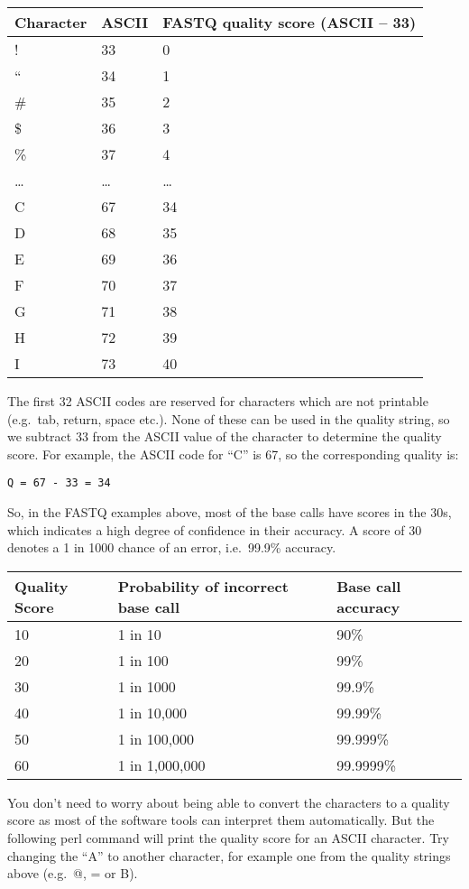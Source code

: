 \documentclass[11pt]{article}
\begin{document}
\begin{longtable}[]{@{}lll@{}}
\toprule
Character & ASCII & FASTQ quality score (ASCII -- 33) \\
\midrule
\endhead
! & 33 & 0 \\
`` & 34 & 1 \\
\# & 35 & 2 \\
\$ & 36 & 3 \\
\% & 37 & 4 \\
\ldots{} & \ldots{} & \ldots{} \\
C & 67 & 34 \\
D & 68 & 35 \\
E & 69 & 36 \\
F & 70 & 37 \\
G & 71 & 38 \\
H & 72 & 39 \\
I & 73 & 40 \\
\bottomrule
\end{longtable}

The first 32 ASCII codes are reserved for characters which are not
printable (e.g.~tab, return, space etc.). None of these can be used in
the quality string, so we subtract 33 from the ASCII value of the
character to determine the quality score. For example, the ASCII code
for ``C'' is 67, so the corresponding quality is:

\begin{verbatim}
Q = 67 - 33 = 34
\end{verbatim}

So, in the FASTQ examples above, most of the base calls have scores in
the 30s, which indicates a high degree of confidence in their accuracy.
A score of 30 denotes a 1 in 1000 chance of an error, i.e.~99.9\%
accuracy.

\begin{longtable}[]{@{}lll@{}}
\toprule
Quality Score & Probability of incorrect base call & Base call
accuracy \\
\midrule
\endhead
10 & 1 in 10 & 90\% \\
20 & 1 in 100 & 99\% \\
30 & 1 in 1000 & 99.9\% \\
40 & 1 in 10,000 & 99.99\% \\
50 & 1 in 100,000 & 99.999\% \\
60 & 1 in 1,000,000 & 99.9999\% \\
\bottomrule
\end{longtable}

You don't need to worry about being able to convert the characters to a
quality score as most of the software tools can interpret them
automatically. But the following perl command will print the quality
score for an ASCII character. Try changing the ``A'' to another
character, for example one from the quality strings above (e.g.~@, = or
B).
\end{document}
